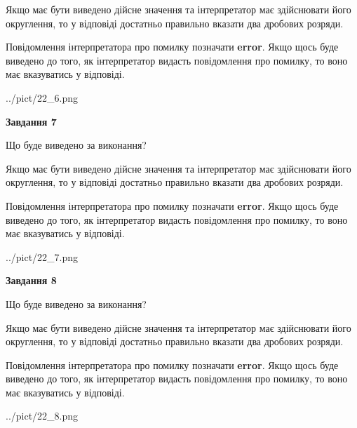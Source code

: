 \documentclass[12pt, ukrainian]{article}
\begin{document}
{\begin {Large}
Якщо має бути виведено дійсне значення та інтерпретатор має здійснювати його округлення, 
то у відповіді достатньо правильно вказати два дробових розряди.

Повідомлення інтерпретатора про помилку позначати \textbf{error}.
Якщо щось буде виведено до того, як інтерпретатор видасть повідомлення про помилку, 
то воно має вказуватись у відповіді. \par

\begin{center}
	{../pict/22_6.png}
\end{center}
\newpage

{\begin {center}\textbf{Завдання 7}\end {center}}\par
Що буде виведено за виконання? \par

Якщо має бути виведено дійсне значення та інтерпретатор має здійснювати його округлення, 
то у відповіді достатньо правильно вказати два дробових розряди.

Повідомлення інтерпретатора про помилку позначати \textbf{error}.
Якщо щось буде виведено до того, як інтерпретатор видасть повідомлення про помилку, 
то воно має вказуватись у відповіді. \par

\begin{center}
	{../pict/22_7.png}
\end{center}
\newpage

{\begin {center}\textbf{Завдання 8}\end {center}}\par
Що буде виведено за виконання? \par

Якщо має бути виведено дійсне значення та інтерпретатор має здійснювати його округлення, 
то у відповіді достатньо правильно вказати два дробових розряди.

Повідомлення інтерпретатора про помилку позначати \textbf{error}.
Якщо щось буде виведено до того, як інтерпретатор видасть повідомлення про помилку, 
то воно має вказуватись у відповіді. \par

\begin{center}
	{../pict/22_8.png}
\end{center}
\newpage


\end{Large}}
\end{document}
